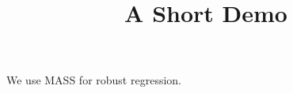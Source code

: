 \documentclass[article]{jss}
\title{A Short Demo}
\begin{document}
We use MASS for robust regression.
\end{document}
